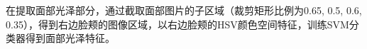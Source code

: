 在提取面部光泽部分，通过截取面部图片的子区域（裁剪矩形比例为{0.65, 0.5, 0.6, 0.35}），得到右边脸颊的图像区域，以右边脸颊的HSV颜色空间特征，训练SVM分类器得到面部光泽特征\cite{周睿2010中医面诊中光泽判别的研究}。
%
%
%
%
%
%
%
%
%
